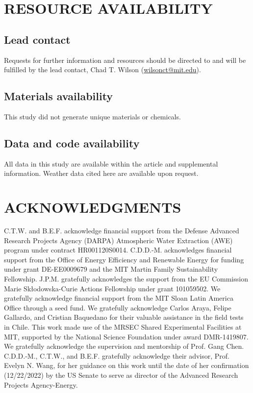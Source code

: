 \documentclass[11pt]{article}
\begin{document}
\section{RESOURCE AVAILABILITY}

\subsection{Lead contact}
Requests for further information and resources should be directed to and will be fulfilled by the lead contact, Chad T. Wilson (\href{mailto:wilsonct@mit.edu}{wilsonct@mit.edu}).

\subsection{Materials availability}
This study did not generate unique materials or chemicals.

\subsection{Data and code availability}
All data in this study are available within the article and supplemental information. Weather data cited here are available upon request.

\section{ACKNOWLEDGMENTS}

C.T.W. and B.E.F. acknowledge financial support from the Defense Advanced Research Projects Agency (DARPA) Atmospheric Water Extraction (AWE) program under contract HR001120S0014. C.D.D.-M. acknowledges financial support from the Office of Energy Efficiency and Renewable Energy for funding under grant DE-EE0009679 and the MIT Martin Family Sustainability Fellowship. J.P.M. gratefully acknowledges the support from the EU Commission Marie Skłodowska-Curie Actions Fellowship under grant 101059502. We gratefully acknowledge financial support from the MIT Sloan Latin America Office through a seed fund. We gratefully acknowledge Carlos Araya, Felipe Gallardo, and Cristian Baquedano for their valuable assistance in the field tests in Chile. This work made use of the MRSEC Shared Experimental Facilities at MIT, supported by the National Science Foundation under award DMR-1419807. We gratefully acknowledge the supervision and mentorship of Prof. Gang Chen. C.D.D.-M., C.T.W., and B.E.F. gratefully acknowledge their advisor, Prof. Evelyn N. Wang, for her guidance on this work until the date of her confirmation (12/22/2022) by the US Senate to serve as director of the Advanced Research Projects Agency-Energy.
\end{document}
